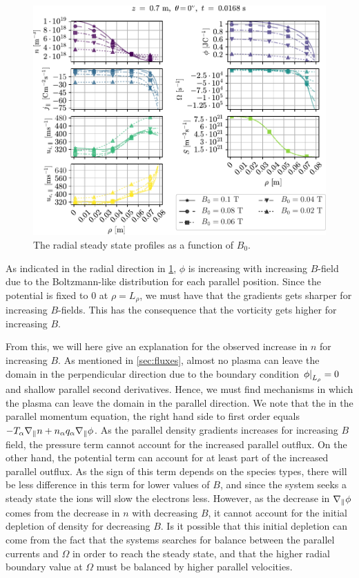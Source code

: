 %
\begin{figure}[htb]
    \centering
    \includegraphics{fig/results/bScan/BScanRad}
    \caption{The radial steady state profiles as a function of $B_0$.}
    \label{fig:BScanRad}
\end{figure}
%
As indicated in the radial direction in \cref{fig:BScanRad}, $\phi$ is increasing with increasing $B$-field due to the Boltzmann-like distribution for each parallel position.
Since the potential is fixed to $0$ at $\rho = L_\rho$, we must have that the gradients gets sharper for increasing $B$-fields.
This has the consequence that the vorticity gets higher for increasing $B$.

From this, we will here give an explanation for the observed increase in $n$ for increasing $B$.
As mentioned in \cref{sec:fluxes}, almost no plasma can leave the domain in the perpendicular direction due to the boundary condition $\left.\phi\right|_{L_\rho}=0$ and shallow parallel second derivatives.
Hence, we must find  mechanisms in which the plasma can leave the domain in the parallel direction.
We note that the in the parallel momentum equation, the right hand side to first order equals $-T_\alpha \nabla_\| n + n_\alpha q_\alpha \nabla_\| \phi$.
As the parallel density gradients increases for increasing $B$ field, the pressure term cannot account for the increased parallel outflux.
On the other hand, the potential term can account for at least part of the increased parallel outflux.
As the sign of this term depends on the species types, there will be less difference in this term for lower values of $B$, and since the system seeks a steady state the ions will slow the electrons less.
However, as the decrease in $\nabla_\| \phi$ comes from the decrease in $n$ with decreasing $B$, it cannot account for the initial depletion of density for decreasing $B$.
Is it possible that this initial depletion can come from the fact that the systems searches for balance between the parallel currents and $\Omega$ in order to reach the steady state, and that the higher radial boundary value at $\Omega$ must be balanced by higher parallel velocities.

